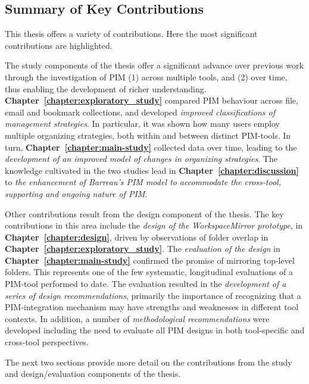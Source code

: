 \subsection{Summary of Key Contributions}
\label{conclusion:contributions:key}
This thesis offers a variety of contributions.  Here the most significant contributions are highlighted.

The study components of the thesis offer a significant advance over previous work through the investigation of PIM (1) across multiple tools, and (2) over time, thus enabling the development of richer understanding. \textbf{Chapter~\ref{chapter:exploratory_study}} compared PIM behaviour across file, email and bookmark collections, and developed \textit{improved classifications of management strategies}. In particular, it was shown how many users employ multiple organizing strategies, both within and between distinct PIM-tools. In turn,  \textbf{Chapter~\ref{chapter:main-study}} collected data over time, leading to the \textit{development of an improved model of changes in organizing strategies}. The knowledge cultivated in the two studies lead in \textbf{Chapter~\ref{chapter:discussion}} to \textit{the enhancement of Barreau's PIM model to accommodate the cross-tool, supporting and ongoing nature of PIM}.

Other contributions result from the design component of the thesis.  The key contributions in this area include the \textit{design of the WorkspaceMirror prototype}, in \textbf{Chapter~\ref{chapter:design}}, driven by observations of folder overlap in  \textbf{Chapter~\ref{chapter:exploratory_study}}. The \textit{evaluation of the design} in \textbf{Chapter~\ref{chapter:main-study}} confirmed the promise of mirroring top-level folders. This represents one of the few systematic, longitudinal evaluations of a PIM-tool performed to date. The evaluation resulted in the \textit{development of a series of design recommendations}, primarily the importance of recognizing that a PIM-integration mechanism may have strengths and weaknesses in different tool contexts. In addition, a number of \textit{methodological recommendations} were developed including the need to evaluate all PIM designs in both tool-specific and cross-tool perspectives.

The next two sections provide more detail on the contributions from the study and design/evaluation components of the thesis.

